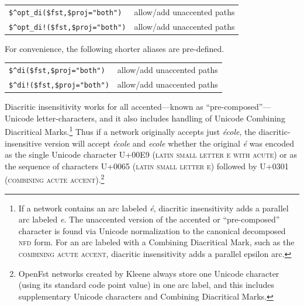 \documentclass[letterpaper,12pt]{article}
\newcommand{\acro}{\textsc}
\begin{document}
\vspace{0.5cm}

\noindent
\begin{tabular}{|l|l|}
\hline
\verb/$^opt_di($fst,/\verb!$proj="both"!\verb!)! & allow/add unaccented paths\\
\verb/$^opt_di!($fst,/\verb!$proj="both"!\verb!)! & allow/add unaccented paths\\
\hline
\end{tabular}

\vspace{0.5cm}

\noindent
For convenience, the following shorter aliases are pre-defined.

\vspace{0.5cm}

\noindent
\begin{tabular}{|l|l|}
\hline
\verb/$^di($fst,/\verb!$proj="both"!\verb!)! & allow/add unaccented paths\\
\verb/$^di!($fst,/\verb!$proj="both"!\verb!)! & allow/add unaccented paths\\
\hline
\end{tabular}

\vspace{0.5cm}

Diacritic insensitivity works for all accented---known as
``pre-composed''---Unicode letter-characters, and it also includes
handling of Unicode Combining Diacritical Marks.\footnote{If a network
contains an arc labeled \emph{\'e}, diacritic insensitivity adds a
parallel arc labeled \emph{e}.  The unaccented version of the accented or
``pre-composed'' character is found via Unicode normalization to the
canonical decomposed \acro{nfd} form.  For an arc labeled with a
Combining Diacritical Mark, such as the \acro{combining acute accent},
diacritic insensitivity adds a parallel epsilon arc.}  Thus if a network
originally accepts just \emph{\'ecole}, the diacritic-insensitive version
will accept \emph{\'ecole} and \emph{ecole} whether the original
\emph{\'e} was encoded as the single Unicode character U+00E9
(\acro{latin small letter e with acute}) or as the sequence of characters
U+0065 (\acro{latin small letter e}) followed by U+0301 (\acro{combining
acute accent}).\footnote{OpenFst networks created by Kleene always store
one Unicode character (using its standard code point value) in one arc
label, and this includes supplementary Unicode characters and Combining
Diacritical Marks.}

\newpage
\end{document}
